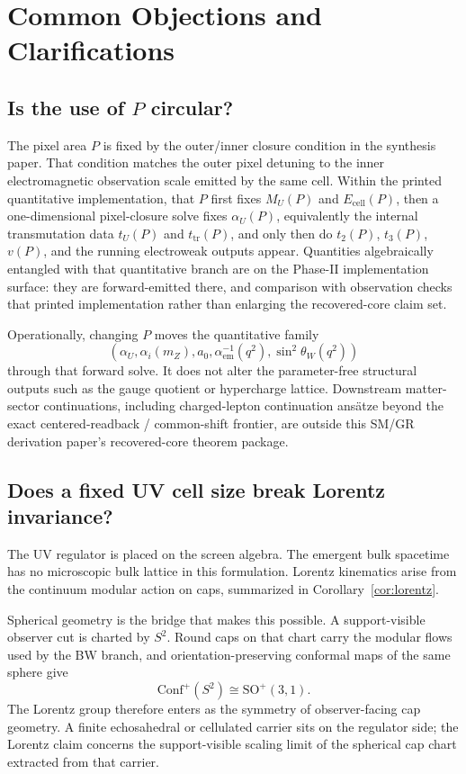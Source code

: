\documentclass[11pt]{article}
\newcommand{\Conf}{\mathrm{Conf}}
\begin{document}
\section{Common Objections and Clarifications}

\subsection{\texorpdfstring{Is the use of $P$ circular?}{Is the use of P circular?}}

The pixel area \(P\) is fixed by the outer/inner closure condition in the synthesis paper. That
condition matches the outer pixel detuning to the inner electromagnetic observation scale emitted
by the same cell. Within the printed quantitative implementation, that \(P\) first fixes \(M_U(P)\) and \(E_{\mathrm{cell}}(P)\), then a
one-dimensional pixel-closure solve fixes \(\alpha_U(P)\), equivalently the internal transmutation
data \(t_U(P)\) and \(t_{\mathrm{tr}}(P)\), and only then do \(t_2(P)\), \(t_3(P)\), \(v(P)\), and
the running electroweak outputs appear. Quantities algebraically entangled with that quantitative
branch are on the Phase-II implementation surface: they are forward-emitted there, and
comparison with observation checks that printed implementation rather than enlarging the
recovered-core claim set.

Operationally, changing \(P\) moves the quantitative family
\[
(\alpha_U,\alpha_i(m_Z),a_0,\alpha_{\mathrm{em}}^{-1}(q^2),\sin^2\theta_W(q^2))
\]
through that forward solve. It does not alter the parameter-free structural outputs such as the
gauge quotient or hypercharge lattice. Downstream matter-sector continuations, including
charged-lepton continuation ans\"atze beyond the exact centered-readback / common-shift frontier,
are outside this SM/GR derivation paper's recovered-core theorem package.

\subsection{Does a fixed UV cell size break Lorentz invariance?}

The UV regulator is placed on the screen algebra. The emergent bulk spacetime has no microscopic
bulk lattice in this formulation. Lorentz kinematics arise from the continuum modular action on
caps, summarized in Corollary~\ref{cor:lorentz}.

Spherical geometry is the bridge that makes this possible. A support-visible observer cut is
charted by \(S^2\). Round caps on that chart carry the modular flows used by the BW branch, and
orientation-preserving conformal maps of the same sphere give
\[
\Conf^+(S^2)\cong \mathrm{SO}^+(3,1).
\]
The Lorentz group therefore enters as the symmetry of observer-facing cap geometry. A finite
echosahedral or cellulated carrier sits on the regulator side; the Lorentz claim concerns the
support-visible scaling limit of the spherical cap chart extracted from that carrier.
\end{document}
